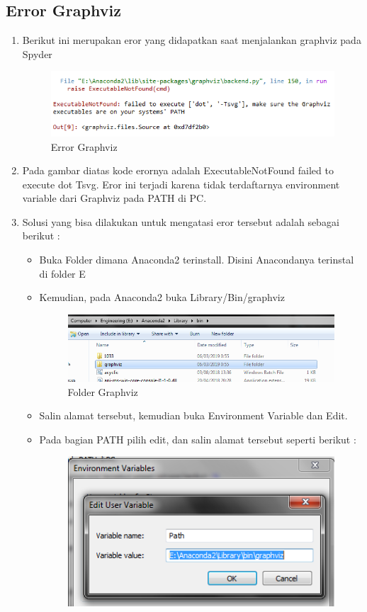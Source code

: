 \subsection{Error Graphviz}
\begin{enumerate}
	\item
Berikut ini merupakan eror yang didapatkan saat menjalankan graphviz pada Spyder
\begin{figure}[ht]
\centering
\includegraphics[scale=0.5]{figures/erorspyder1.png}
\caption{Error Graphviz}
\label{Error}
\end{figure}
	\item
Pada gambar diatas kode erornya adalah ExecutableNotFound failed to execute dot Tsvg. Eror ini terjadi karena tidak terdaftarnya environment variable dari Graphviz pada PATH di PC.
	\item
Solusi yang bisa dilakukan untuk mengatasi eror tersebut adalah sebagai berikut : \\
\begin{itemize}
\item
Buka Folder dimana Anaconda2 terinstall. Disini Anacondanya terinstal di folder E
\item
Kemudian, pada Anaconda2 buka Library/Bin/graphviz
\begin{figure}[ht]
\centering
\includegraphics[scale=0.5]{figures/solusi3.png}
\caption{Folder Graphviz}
\label{Eror}
\end{figure}
\item
Salin alamat tersebut, kemudian buka Environment Variable dan Edit. 
\item
Pada bagian PATH pilih edit, dan salin alamat tersebut seperti berikut :
\begin{figure}[ht]
\centering
\includegraphics[scale=0.5]{figures/solusi4.png}

\end{figure}
\end{itemize}
\end{enumerate}

